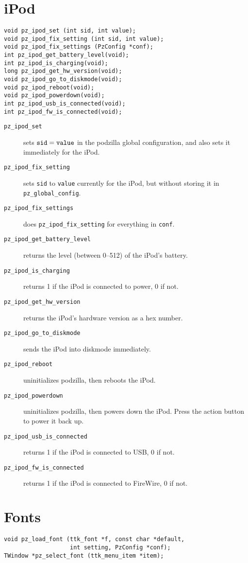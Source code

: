 \documentclass[12pt,letterpaper]{report}
\let\ttt\tt
\def\tt{\def\_{{\ttt\char`\_}}\ttt}
\begin{document}
\section{iPod}
\begin{verbatim}
void pz_ipod_set (int sid, int value);
void pz_ipod_fix_setting (int sid, int value);
void pz_ipod_fix_settings (PzConfig *conf);
int pz_ipod_get_battery_level(void);
int pz_ipod_is_charging(void);
long pz_ipod_get_hw_version(void);
void pz_ipod_go_to_diskmode(void);
void pz_ipod_reboot(void);
void pz_ipod_powerdown(void);
int pz_ipod_usb_is_connected(void);
int pz_ipod_fw_is_connected(void);
\end{verbatim}
\begin{description}
\item[{\tt pz_ipod_set}] sets $\verb|sid| = \verb|value|$ in the podzilla global configuration,
and also sets it immediately for the iPod.
\item[{\tt pz_ipod_fix_setting}] sets \verb|sid| to \verb|value| currently for the iPod, but without
storing it in \verb|pz_global_config|.
\item[{\tt pz_ipod_fix_settings}] does \verb|pz_ipod_fix_setting| for everything in \verb|conf|.
\item[{\tt pz_ipod_get_battery_level}] returns the level (between 0--512) of the iPod's battery.
\item[{\tt pz_ipod_is_charging}] returns 1 if the iPod is connected to power, 0 if not.
\item[{\tt pz_ipod_get_hw_version}] returns the iPod's hardware version as a hex number.
\item[{\tt pz_ipod_go_to_diskmode}] sends the iPod into diskmode immediately.
\item[{\tt pz_ipod_reboot}] uninitializes podzilla, then reboots the iPod.
\item[{\tt pz_ipod_powerdown}] uninitializes podzilla, then powers down the iPod. Press the action
button to power it back up.
\item[{\tt pz_ipod_usb_is_connected}] returns 1 if the iPod is connected to USB, 0 if not.
\item[{\tt pz_ipod_fw_is_connected}] returns 1 if the iPod is connected to FireWire, 0 if not.
\end{description}

\section{Fonts}
\begin{verbatim}
void pz_load_font (ttk_font *f, const char *default,
                   int setting, PzConfig *conf);
TWindow *pz_select_font (ttk_menu_item *item);
\end{verbatim}
\end{document}
